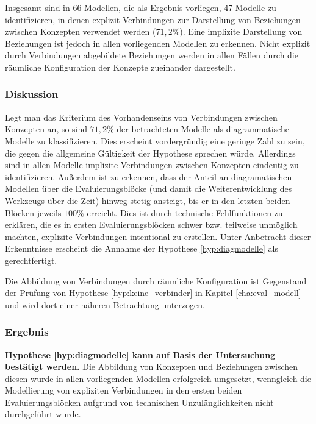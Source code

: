 Insgesamt sind in 66 Modellen, die als Ergebnis vorliegen, 47 Modelle zu identifizieren, in denen explizit Verbindungen zur Darstellung von Beziehungen zwischen Konzepten verwendet werden ($71,2\%$). Eine implizite Darstellung von Beziehungen ist jedoch in allen vorliegenden Modellen zu erkennen. Nicht explizit durch Verbindungen abgebildete Beziehungen werden in allen Fällen durch die räumliche Konfiguration der Konzepte zueinander dargestellt.

\subsubsection{Diskussion} %

Legt man das Kriterium des Vorhandenseins von Verbindungen zwischen Konzepten an, so sind $71,2\%$ der betrachteten Modelle als diagrammatische Modelle zu klassifizieren. Dies erscheint vordergründig eine geringe Zahl zu sein, die gegen die allgemeine Gültigkeit der Hypothese sprechen würde. Allerdings sind in allen Modelle implizite Verbindungen zwischen Konzepten eindeutig zu identifizieren. Außerdem ist zu erkennen, dass der Anteil an diagramatischen Modellen über die Evaluierungsblöcke (und damit die Weiterentwicklung des Werkzeugs über die Zeit) hinweg stetig ansteigt, bis er in den letzten beiden Blöcken jeweils $100\%$ erreicht. Dies ist durch technische Fehlfunktionen zu erklären, die es in ersten Evaluierungsblöcken schwer bzw. teilweise unmöglich machten, explizite Verbindungen intentional zu erstellen. Unter Anbetracht dieser Erkenntnisse erscheint die Annahme der Hypothese \ref{hyp:diagmodelle} als gerechtfertigt.

Die Abbildung von Verbindungen durch räumliche Konfiguration ist Gegenstand der Prüfung von Hypothese \ref{hyp:keine_verbinder} in Kapitel \ref{cha:eval_modell} und wird dort einer näheren Betrachtung unterzogen.

\subsubsection{Ergebnis} %

\textbf{Hypothese \ref{hyp:diagmodelle} kann auf Basis der Untersuchung bestätigt werden.} Die Abbildung von Konzepten und Beziehungen zwischen diesen wurde in allen vorliegenden Modellen erfolgreich umgesetzt, wenngleich die Modellierung von expliziten Verbindungen in den ersten beiden Evaluierungsblöcken aufgrund von technischen Unzulänglichkeiten nicht durchgeführt wurde.

